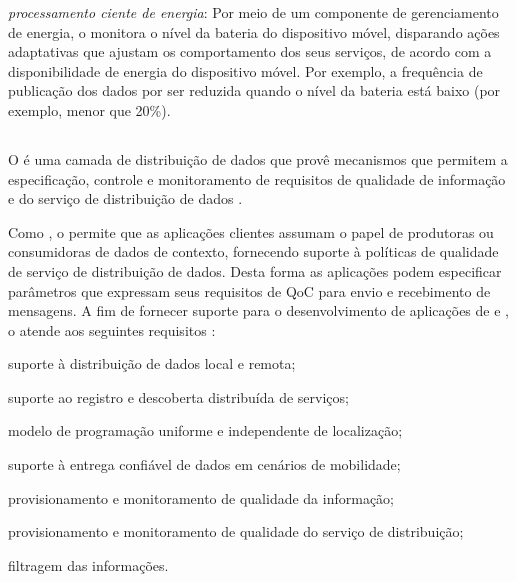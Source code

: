 \begin{alineas}
	\item \emph{processamento ciente de energia}:
		Por meio de um componente de gerenciamento de energia, o \mhub monitora o nível da bateria do dispositivo móvel, disparando ações adaptativas que ajustam os comportamento dos seus serviços, de acordo com a disponibilidade de energia do dispositivo móvel. Por exemplo, a frequência de publicação dos dados por ser reduzida quando o nível da bateria está baixo (por exemplo, menor que 20\%).
\end{alineas}

\subsection{\cddl} \label{subsec:cddl}

O \cddl é uma camada de distribuição de dados que provê mecanismos que permitem a especificação, controle e monitoramento de requisitos de qualidade de informação e do serviço de distribuição de dados \cite{gomes:2017}.

Como \middleware, o \cddl permite que as aplicações clientes assumam o papel de produtoras ou consumidoras de dados de contexto, fornecendo suporte à políticas de qualidade de serviço de distribuição de dados. Desta forma as aplicações podem especificar parâmetros que expressam seus requisitos de QoC para envio e recebimento de mensagens. A fim de fornecer suporte para o desenvolvimento de aplicações de \iot e \iomt, o \cddl atende aos seguintes requisitos \cite{muniz:2017}:

\begin{alineas}
	\item suporte à distribuição de dados local e remota;

	\item suporte ao registro e descoberta distribuída de serviços;

	\item modelo de programação uniforme e independente de localização;

	\item suporte à entrega confiável de dados em cenários de mobilidade;

	\item provisionamento e monitoramento de qualidade da informação;

	\item provisionamento e monitoramento de qualidade do serviço de distribuição;

	\item filtragem das informações.
\end{alineas}

